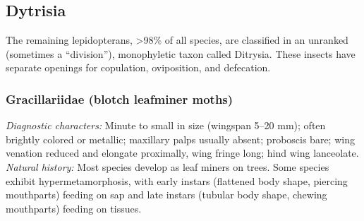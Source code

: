\documentclass[letterpaper, 11pt]{article}
\begin{document}
\subsection{Dytrisia}
The remaining lepidopterans, \textgreater98\% of all species, are classified in an unranked (sometimes a ``division''), monophyletic taxon called Ditrysia. These insects have separate openings for copulation, oviposition, and defecation.

\subsubsection{Gracillariidae (blotch leafminer moths)}
\noindent{}\textit{Diagnostic characters:} Minute to small in size (wingspan 5--20 mm); often brightly colored or metallic; maxillary palps usually absent;  proboscis bare; wing venation reduced and elongate proximally, wing fringe long; hind wing lanceolate.\\

\noindent{}\textit{Natural history:} Most species develop as leaf miners on trees. Some species exhibit hypermetamorphosis, with early instars (flattened body shape, piercing mouthparts) feeding on sap and late instars (tubular body shape, chewing mouthparts) feeding on tissues.
\end{document}
